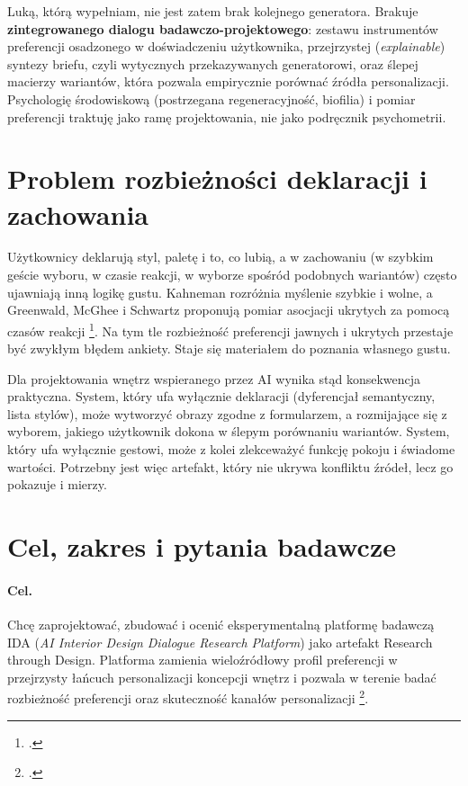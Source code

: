 Luką, którą wypełniam, nie jest zatem brak kolejnego generatora. Brakuje \textbf{zintegrowanego dialogu badawczo-projektowego}: zestawu instrumentów preferencji osadzonego w doświadczeniu użytkownika, przejrzystej (\emph{explainable}) syntezy briefu, czyli wytycznych przekazywanych generatorowi, oraz ślepej macierzy wariantów, która pozwala empirycznie porównać źródła personalizacji.
Psychologię środowiskową (postrzegana regeneracyjność, biofilia) i pomiar preferencji traktuję jako ramę projektowania, nie jako podręcznik psychometrii.

\section{Problem rozbieżności deklaracji i zachowania}
\label{ch01:sec:problem}

Użytkownicy deklarują styl, paletę i to, co lubią, a w zachowaniu (w szybkim geście wyboru, w czasie reakcji, w wyborze spośród podobnych wariantów) często ujawniają inną logikę gustu.
Kahneman rozróżnia myślenie szybkie i wolne, a Greenwald, McGhee i Schwartz proponują pomiar asocjacji ukrytych za pomocą czasów reakcji \footcite{kahneman2011thinking,greenwald1998iat}.
Na tym tle rozbieżność preferencji jawnych i ukrytych przestaje być zwykłym błędem ankiety. Staje się materiałem do poznania własnego gustu.

Dla projektowania wnętrz wspieranego przez AI wynika stąd konsekwencja praktyczna. System, który ufa wyłącznie deklaracji (dyferencjał semantyczny, lista stylów), może wytworzyć obrazy zgodne z formularzem, a rozmijające się z wyborem, jakiego użytkownik dokona w ślepym porównaniu wariantów.
System, który ufa wyłącznie gestowi, może z kolei zlekceważyć funkcję pokoju i świadome wartości.
Potrzebny jest więc artefakt, który nie ukrywa konfliktu źródeł, lecz go pokazuje i mierzy.

\section{Cel, zakres i pytania badawcze}
\label{ch01:sec:cel}

\paragraph{Cel.}
Chcę zaprojektować, zbudować i ocenić eksperymentalną platformę badawczą IDA (\emph{AI Interior Design Dialogue Research Platform}) jako artefakt Research through Design. Platforma zamienia wieloźródłowy profil preferencji w przejrzysty łańcuch personalizacji koncepcji wnętrz i pozwala w terenie badać rozbieżność preferencji oraz skuteczność kanałów personalizacji \footcite{idaPlatform2026}.

